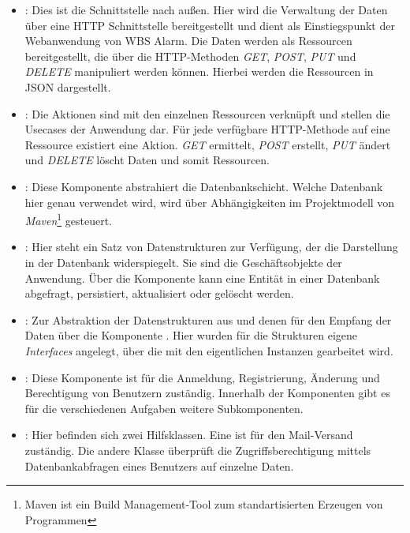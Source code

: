 \begin{itemize}
\item {}: Dies ist die Schnittstelle nach außen. Hier wird die Verwaltung der Daten über eine HTTP Schnittstelle bereitgestellt und dient als Einstiegspunkt der Webanwendung von WBS Alarm. Die Daten werden als Ressourcen bereitgestellt, die über die HTTP-Methoden \textit{GET}, \textit{POST}, \textit{PUT} und \textit{DELETE} manipuliert werden können. Hierbei werden die Ressourcen in \ac{JSON} dargestellt.

\item {}: Die Aktionen sind mit den einzelnen Ressourcen verknüpft und stellen die Usecases der Anwendung dar. Für jede verfügbare HTTP-Methode auf eine Ressource existiert eine Aktion. \textit{GET} ermittelt, \textit{POST} erstellt, \textit{PUT} ändert und \textit{DELETE} löscht Daten und somit Ressourcen.

\item {}: Diese Komponente abstrahiert die Datenbankschicht. Welche Datenbank hier genau verwendet wird, wird über Abhängigkeiten im Projektmodell von \textit{Maven}\footnote{Maven ist ein Build Management-Tool zum standartisierten Erzeugen von Programmen} gesteuert. 

\item {}: Hier steht ein Satz von Datenstrukturen zur Verfügung, der die Darstellung in der Datenbank widerspiegelt. Sie sind die Geschäftsobjekte der Anwendung. Über die Komponente  kann eine Entität in einer Datenbank abgefragt, persistiert, aktualisiert oder gelöscht werden.

\item {}: Zur Abstraktion der Datenstrukturen aus  und denen für den Empfang der Daten über die Komponente . Hier wurden für die Strukturen eigene \textit{Interfaces} angelegt, über die mit den eigentlichen Instanzen gearbeitet wird.

\item {}: Diese Komponente ist für die Anmeldung, Registrierung, Änderung und Berechtigung von Benutzern zuständig. Innerhalb der Komponenten gibt es für die verschiedenen Aufgaben weitere Subkomponenten. 

\item {}: Hier befinden sich zwei Hilfsklassen. Eine ist für den Mail-Versand zuständig. Die andere Klasse überprüft die Zugriffsberechtigung mittels Datenbankabfragen eines Benutzers auf einzelne Daten.
\end{itemize}

